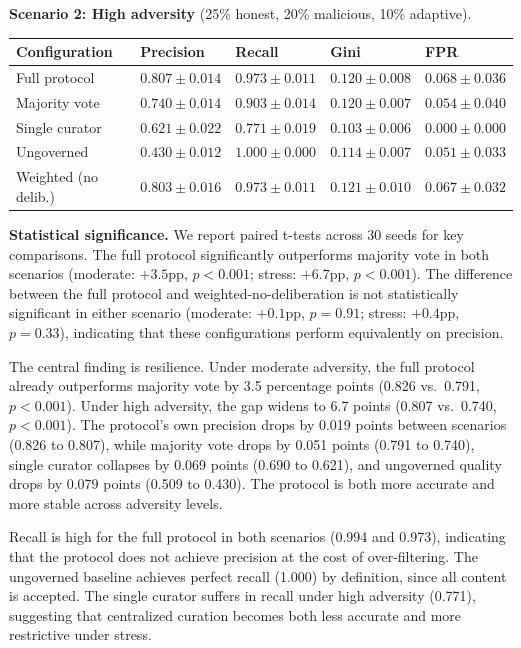\documentclass[11pt]{article}
\begin{document}
\textbf{Scenario 2: High adversity} (25\% honest, 20\% malicious, 10\% adaptive).

\begin{table}[h]
\centering
\small
\begin{tabular}{lllll}
\toprule
\textbf{Configuration} & \textbf{Precision} & \textbf{Recall} & \textbf{Gini} & \textbf{FPR} \\
\midrule
Full protocol & $0.807 \pm 0.014$ & $0.973 \pm 0.011$ & $0.120 \pm 0.008$ & $0.068 \pm 0.036$ \\
Majority vote & $0.740 \pm 0.014$ & $0.903 \pm 0.014$ & $0.120 \pm 0.007$ & $0.054 \pm 0.040$ \\
Single curator & $0.621 \pm 0.022$ & $0.771 \pm 0.019$ & $0.103 \pm 0.006$ & $0.000 \pm 0.000$ \\
Ungoverned & $0.430 \pm 0.012$ & $1.000 \pm 0.000$ & $0.114 \pm 0.007$ & $0.051 \pm 0.033$ \\
Weighted (no delib.) & $0.803 \pm 0.016$ & $0.973 \pm 0.011$ & $0.121 \pm 0.010$ & $0.067 \pm 0.032$ \\
\bottomrule
\end{tabular}
\end{table}

\textbf{Statistical significance.} We report paired t-tests across 30 seeds for key comparisons. The full protocol significantly outperforms majority vote in both scenarios (moderate: $+3.5$pp, $p < 0.001$; stress: $+6.7$pp, $p < 0.001$). The difference between the full protocol and weighted-no-deliberation is not statistically significant in either scenario (moderate: $+0.1$pp, $p = 0.91$; stress: $+0.4$pp, $p = 0.33$), indicating that these configurations perform equivalently on precision.

The central finding is resilience. Under moderate adversity, the full protocol already outperforms majority vote by 3.5 percentage points (0.826 vs.\ 0.791, $p < 0.001$). Under high adversity, the gap widens to 6.7 points (0.807 vs.\ 0.740, $p < 0.001$). The protocol's own precision drops by 0.019 points between scenarios (0.826 to 0.807), while majority vote drops by 0.051 points (0.791 to 0.740), single curator collapses by 0.069 points (0.690 to 0.621), and ungoverned quality drops by 0.079 points (0.509 to 0.430). The protocol is both more accurate and more stable across adversity levels.

Recall is high for the full protocol in both scenarios (0.994 and 0.973), indicating that the protocol does not achieve precision at the cost of over-filtering. The ungoverned baseline achieves perfect recall (1.000) by definition, since all content is accepted. The single curator suffers in recall under high adversity (0.771), suggesting that centralized curation becomes both less accurate and more restrictive under stress.
\end{document}
